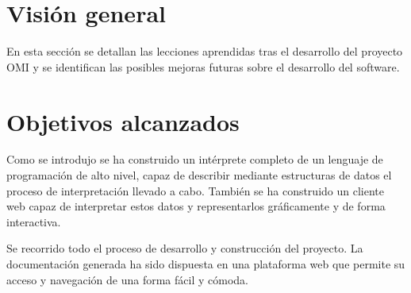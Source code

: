 \section{Visión general}
En esta sección se detallan las lecciones aprendidas tras el desarrollo del proyecto OMI y
se identifican las posibles mejoras futuras sobre el desarrollo del software.
\section{Objetivos alcanzados}
Como se introdujo se ha construido un intérprete completo de un lenguaje de programación de 
alto nivel, capaz de describir mediante estructuras de datos el proceso de interpretación llevado a cabo. También se 
ha construido un cliente web capaz de interpretar estos datos y representarlos gráficamente y de forma interactiva.

Se recorrido todo el proceso de desarrollo y construcción del proyecto. La documentación generada ha sido dispuesta 
en una plataforma web que permite su acceso y navegación de una forma fácil y cómoda. 

